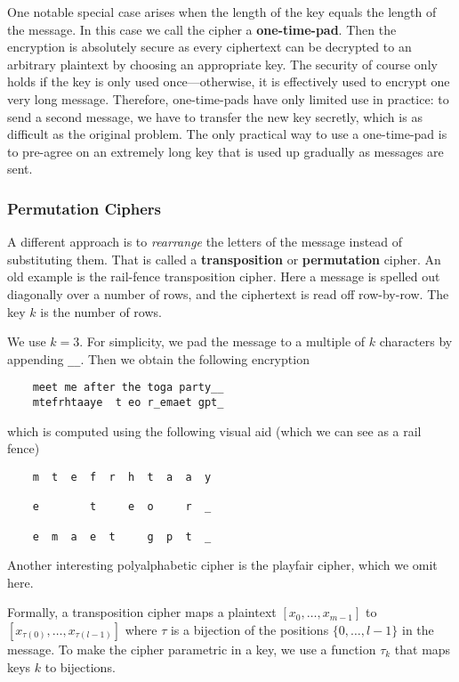 One notable special case arises when the length of the key equals the length of the message.
In this case we call the cipher a \textbf{one-time-pad}.
Then the encryption is absolutely secure as every ciphertext can be decrypted to an arbitrary plaintext by choosing an appropriate key.
The security of course only holds if the key is only used once---otherwise, it is effectively used to encrypt one very long message.
Therefore, one-time-pads have only limited use in practice: to send a second message, we have to transfer the new key secretly, which is as difficult as the original problem.
The only practical way to use a one-time-pad is to pre-agree on an extremely long key that is used up gradually as messages are sent.

\subsubsection{Permutation Ciphers}

A different approach is to \emph{rearrange} the letters of the message instead of substituting them.
That is called a \textbf{transposition} or \textbf{permutation} cipher.
An old example is the rail-fence transposition cipher.
Here a message is spelled out diagonally over a number of rows, and the ciphertext is read off row-by-row.
The key $k$ is the number of rows.

\begin{example}
 We use $k=3$.
 For simplicity, we pad the message to a multiple of $k$ characters by appending \lstinline|__|.
 Then we obtain the following encryption
  \begin{lstlisting}
    meet me after the toga party__
    mtefrhtaaye  t eo r_emaet gpt_
  \end{lstlisting}
which is computed using the following visual aid (which we can see as a rail fence)
  \begin{lstlisting}
    m  t  e  f  r  h  t  a  a  y
    
    e        t     e  o     r  _
    
    e  m  a  e  t     g  p  t  _
  \end{lstlisting}
\end{example}
Another interesting polyalphabetic cipher is the playfair cipher, which we omit here.

Formally, a transposition cipher maps a plaintext $[x_0,\ldots,x_{m-1}]$ to $[x_{\tau(0)},\ldots,x_{\tau(l-1)}]$ where $\tau$ is a bijection of the positions $\{0,\ldots,l-1\}$ in the message.
To make the cipher parametric in a key, we use a function $\tau_k$ that maps keys $k$ to bijections.

